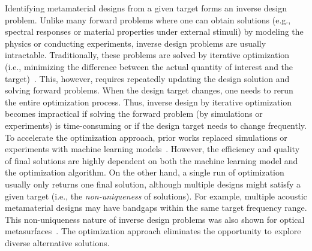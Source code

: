 \documentclass{article}
\begin{document}
Identifying metamaterial designs from a given target forms an inverse design problem. Unlike many forward problems where one can obtain solutions (e.g., spectral responses or material properties under external stimuli) by modeling the physics or conducting experiments, inverse design problems are usually intractable. Traditionally, these problems are solved by iterative optimization (i.e., minimizing the difference between the actual quantity of interest and the target)~\cite{ronellenfitsch2019inverse,goh2020inverse,zhang2021realization}. This, however, requires repeatedly updating the design solution and solving forward problems. When the design target changes, one needs to rerun the entire optimization process. Thus, inverse design by iterative optimization becomes impractical if solving the forward problem (by simulations or experiments) is time-consuming or if the design target needs to change frequently. To accelerate the optimization approach, prior works replaced simulations or experiments with machine learning models~\cite{inampudi2018neural,zhelyeznyakov2021deep}. However, the efficiency and quality of final solutions are highly dependent on both the machine learning model and the optimization algorithm. On the other hand, a single run of optimization usually only returns one final solution, although multiple designs might satisfy a given target (i.e., the \textit{non-uniqueness} of solutions). For example, multiple acoustic metamaterial designs may have bandgaps within the same target frequency range. This non-uniqueness nature of inverse design problems was also shown for optical metasurfaces~\cite{liu2018training, ma2019probabilistic, An2021MultifunctionalNetwork}. The optimization approach eliminates the opportunity to explore diverse alternative solutions. 
\end{document}
